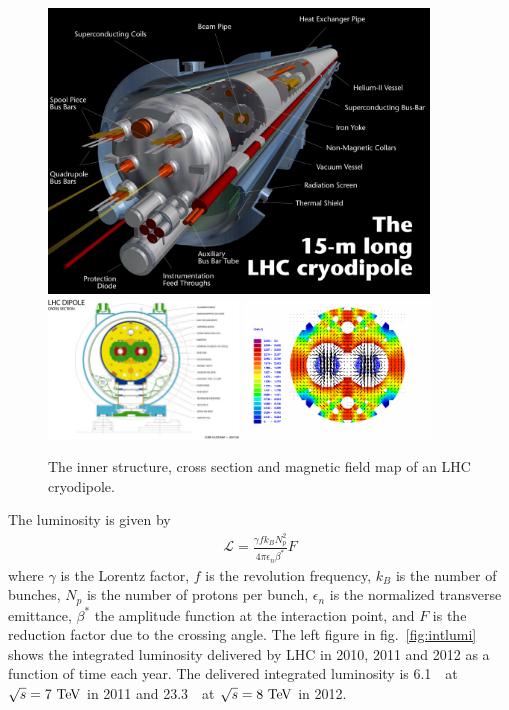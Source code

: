 
%
\begin{figure}[ht!] 
\centering 
\includegraphics[width=0.9\textwidth]{figures/cryodipole.jpg} 
\\
\vspace{1cm}
\includegraphics[width=0.45\textwidth]{figures/LHC-PHO-2001-187.jpg}
\includegraphics[width=0.45\textwidth]{figures/LHC-Dipole-Magnetic-Field.png}
\caption{The inner structure, cross section and magnetic field map of
an LHC cryodipole.} 
\label{fig:SCdipole} 
\end{figure} 

The luminosity is given by 
\begin{eqnarray} 
\mathcal{L} = \frac{\gamma f k_B N_p^2}{4 \pi \epsilon_n \beta^*} F 
\end{eqnarray} 
where $\gamma$ is the Lorentz factor, 
$f$ is the revolution frequency, 
$k_B$ is the number of bunches,
$N_p$ is the number of protons per bunch, 
$\epsilon_n$ is the normalized transverse emittance, 
$\beta^*$ the amplitude function at the interaction point, 
and $F$ is the reduction factor due to the crossing angle.
The left figure in fig.~\ref{fig:intlumi} shows the integrated luminosity 
delivered by LHC in 2010, 2011 and 2012 as a function of time each year. 
The delivered integrated luminosity is 6.1~\ifb\ at $\sqrt{s}=7~\mathrm{Te\kern -0.1em V}$ in 2011
and 23.3~\ifb\ at $\sqrt{s}=8~\mathrm{Te\kern -0.1em V}$ in 2012. 

